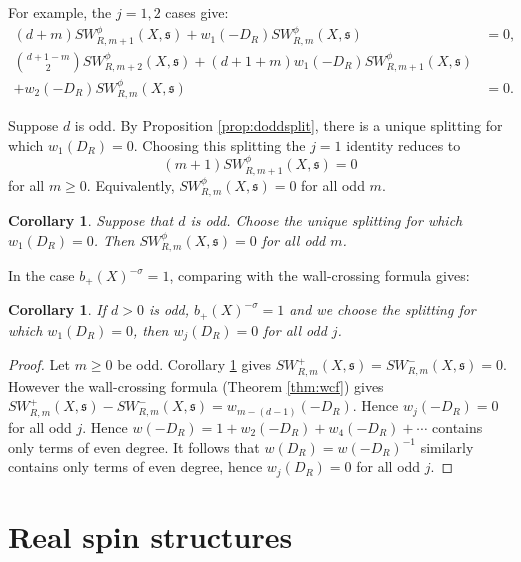 \documentclass{amsart}
\newtheorem{corollary}[theorem]{Corollary}
\theoremstyle{definition}
\theoremstyle{remark}
\numberwithin{equation}{section}
\begin{document}
For example, the $j=1,2$ cases give:
\begin{align*}
(d+m) SW^\phi_{R,m+1}(X,\mathfrak{s}) + w_1(-D_R) SW^\phi_{R,m}(X,\mathfrak{s}) &= 0, \\
\binom{d+1-m}{2} SW^\phi_{R,m+2}(X,\mathfrak{s}) + (d+1+m)w_1(-D_R) SW^\phi_{R,m+1}(X,\mathfrak{s}) & \\
+ w_2(-D_R) SW^\phi_{R,m}(X,\mathfrak{s}) &= 0.
\end{align*}

Suppose $d$ is odd. By Proposition \ref{prop:doddsplit}, there is a unique splitting for which $w_1(D_R) = 0$. Choosing this splitting the $j=1$ identity reduces to
\[
(m+1)SW^\phi_{R,m+1}(X,\mathfrak{s}) = 0
\]
for all $m \ge 0$. Equivalently, $SW^\phi_{R,m}(X,\mathfrak{s}) = 0$ for all odd $m$.

\begin{corollary}\label{cor:vanish}
Suppose that $d$ is odd. Choose the unique splitting for which $w_1(D_R) = 0$. Then $SW^\phi_{R,m}(X,\mathfrak{s}) = 0$ for all odd $m$.
\end{corollary}

In the case $b_+(X)^{-\sigma} = 1$, comparing with the wall-crossing formula gives:

\begin{corollary}\label{cor:oddvanish}
If $d > 0$ is odd, $b_+(X)^{-\sigma} = 1$ and we choose the splitting for which $w_1(D_R) = 0$, then $w_j(D_R) = 0$ for all odd $j$.
\end{corollary}
\begin{proof}
Let $m \ge 0$ be odd. Corollary \ref{cor:vanish} gives $SW^+_{R,m}(X,\mathfrak{s}) = SW^-_{R,m}(X,\mathfrak{s}) = 0$. However the wall-crossing formula (Theorem \ref{thm:wcf}) gives $SW^+_{R,m}(X,\mathfrak{s}) - SW^-_{R,m}(X,\mathfrak{s}) = w_{m-(d-1)}(-D_R)$. Hence $w_j(-D_R) = 0$ for all odd $j$. Hence $w(-D_R) = 1 + w_2(-D_R) + w_4(-D_R) + \cdots$ contains only terms of even degree. It follows that $w(D_R) = w(-D_R)^{-1}$ similarly contains only terms of even degree, hence $w_j(D_R) = 0$ for all odd $j$.
\end{proof}




\section{Real spin structures}\label{sec:spin}
\end{document}
